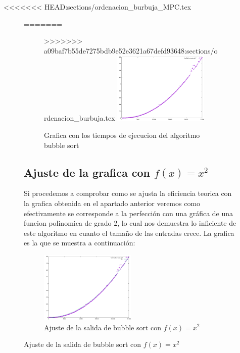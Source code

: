 <<<<<<< HEAD:sections/ordenacion_burbuja_MPC.tex
\begin{figure}[h]
=======
\begin{figure}[H]
>>>>>>> a09baf7b55de7275bdb9e52e3621a67defd93648:sections/ordenacion_burbuja.tex
  \centering
  \includegraphics[width=0.5\textwidth]{./Imagenes/burbuja_pela.png}
  \caption{Grafica con los tiempos de ejecucion del algoritmo bubble sort}
\end{figure}


\subsection{Ajuste de la grafica con $f(x)=x^{2}$}
Si procedemos a comprobar como se ajusta la eficiencia teorica con la grafica obtenida en el apartado anterior veremos como efectivamente se corresponde a la perfección con una gráfica de una funcion polinomica de grado 2, lo cual nos demuestra lo inficiente de este algoritmo en cuanto el tamaño de las entradas crece. La grafica es la que se muestra a continuación:

\begin{figure}[h]
  \centering
  \includegraphics[width=0.5\textwidth]{./Imagenes/burbuja_ajustada.png}
  \caption{Ajuste de la salida de bubble sort con $f(x)=x^{2}$}
\end{figure}


\end{figure}
